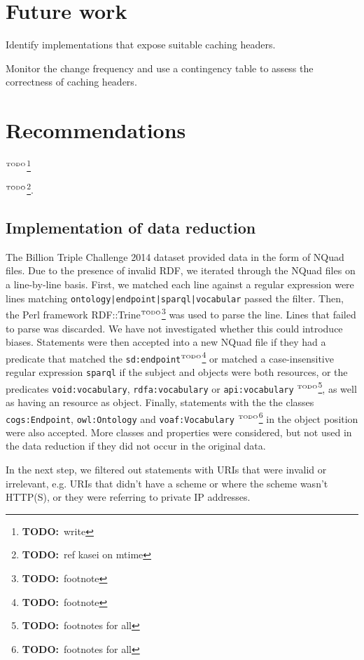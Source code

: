 \documentclass{article}
\newcommand{\rdfterm}[1]{\texttt{#1}}
\newcommand{\todo}[1]{\ensuremath{^{\textrm{\tiny{TODO}\normalsize}}}\footnote{\textbf{TODO:}~#1}}
\begin{document}
\section{Future work}

Identify implementations that expose suitable caching headers.

Monitor the change frequency and use a contingency table to assess the
correctness of caching headers.

\section{Recommendations}\todo{write}

\todo{ref kasei on mtime}.

\begin{appendices}

\section{Implementation of data reduction}\label{app:reduction}

The Billion Triple Challenge 2014 dataset provided data in the form of
NQuad files. Due to the presence of invalid RDF, we iterated through
the NQuad files on a line-by-line basis. First, we matched each line
against a regular expression were lines matching
\texttt{ontology|endpoint|sparql|vocabular} passed the filter. Then,
the Perl framework RDF::Trine\todo{footnote} was used to parse the
line. Lines that failed to parse was discarded. We have not
investigated whether this could introduce biases. Statements were then
accepted into a new NQuad file if they had a predicate that matched
the \rdfterm{sd:endpoint}\todo{footnote} or matched a case-insensitive
regular expression \texttt{sparql} if the subject and objects were
both resources, or the predicates \rdfterm{void:vocabulary},
\rdfterm{rdfa:vocabulary} or \rdfterm{api:vocabulary} \todo{footnotes
  for all}, as well as having an resource as object. Finally,
statements with the the classes \rdfterm{cogs:Endpoint},
\rdfterm{owl:Ontology} and \rdfterm{voaf:Vocabulary} \todo{footnotes
  for all} in the object position were also accepted. More classes and
properties were considered, but not used in the data reduction if they
did not occur in the original data.

In the next step, we filtered out statements with URIs that were
invalid or irrelevant, e.g. URIs that didn't have a scheme or where
the scheme wasn't HTTP(S), or they were referring to private IP addresses.


\end{appendices}
\end{document}

